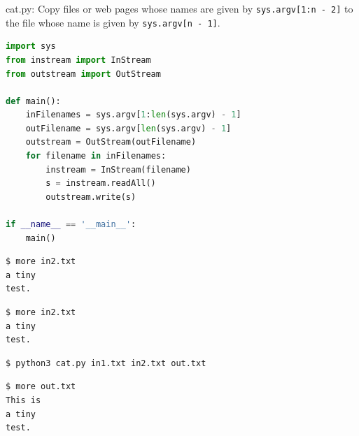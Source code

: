 \documentclass[8pt,a4paper,compress]{beamer}
\begin{document}
\begin{frame}[fragile]
\pause

\begin{framed}
\tiny cat.py: Copy files or web pages whose names are given by \lstinline{sys.argv[1:n - 2]} to the file whose name is given by \lstinline{sys.argv[n - 1]}.
\end{framed}

\begin{lstlisting}[language=Python,style=focusin]
import sys
from instream import InStream
from outstream import OutStream

def main():
    inFilenames = sys.argv[1:len(sys.argv) - 1]
    outFilename = sys.argv[len(sys.argv) - 1]
    outstream = OutStream(outFilename)
    for filename in inFilenames:
        instream = InStream(filename)
        s = instream.readAll()
        outstream.write(s)

if __name__ == '__main__':
    main()
\end{lstlisting}

\pause
\bigskip

\begin{lstlisting}[language={},style=focusin]
$ more in2.txt
a tiny
test.
\end{lstlisting}

\pause
\smallskip

\begin{lstlisting}[language={},style=focusin]
$ more in2.txt
a tiny
test.
\end{lstlisting}

\pause
\smallskip

\begin{lstlisting}[language={},style=focusin]
$ python3 cat.py in1.txt in2.txt out.txt
\end{lstlisting}

\pause
\smallskip

\begin{lstlisting}[language={},style=focusin]
$ more out.txt
This is
a tiny
test.
\end{lstlisting}
\end{frame}
\end{document}
